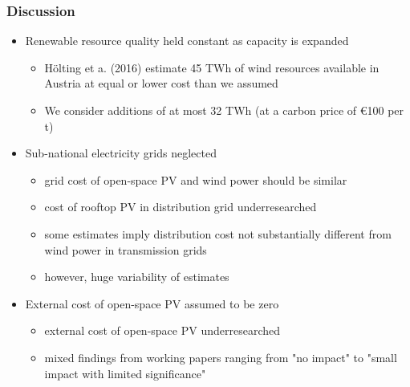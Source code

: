\documentclass[aspectratio=1610, xcolor=dvipsnames]{beamer}
\begin{document}

    \begin{frame}
        \frametitle{Discussion}
        \begin{itemize}
            \item Renewable resource quality held constant as capacity is expanded
            \begin{itemize}
                \item Hölting et a. (2016) estimate 45 TWh of wind resources available in Austria at equal or lower cost
                than we assumed
                \item We consider additions of at most 32 TWh (at a carbon price of \euro 100 per t)
            \end{itemize}
            \item Sub-national electricity grids neglected
            \begin{itemize}
                \item grid cost of open-space PV and wind power should be similar
                \item cost of rooftop PV in distribution grid underresearched
                \item some estimates imply distribution cost not substantially different from wind power in transmission grids
                \item however, huge variability of estimates
            \end{itemize}
            \item External cost of open-space PV assumed to be zero
            \begin{itemize}
                \item external cost of open-space PV underresearched
                \item mixed findings from working papers ranging from "no impact" to "small impact with limited significance"
            \end{itemize}
        \end{itemize}
    \end{frame}
\end{document}
